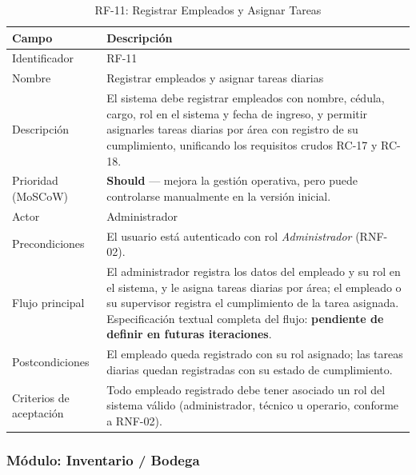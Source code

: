 \documentclass[12pt,a4paper]{article}
\begin{document}
\begin{table}[H]
\centering
\caption{RF-11: Registrar Empleados y Asignar Tareas}
\begin{tabular}{|p{3.6cm}|p{10.4cm}|}
\hline
\textbf{Campo} & \textbf{Descripción} \\
\hline
Identificador & RF-11 \\ \hline
Nombre & Registrar empleados y asignar tareas diarias \\ \hline
Descripción & El sistema debe registrar empleados con nombre, cédula, cargo,
rol en el sistema y fecha de ingreso, y permitir asignarles tareas diarias por
área con registro de su cumplimiento, unificando los requisitos crudos RC-17 y
RC-18. \\ \hline
Prioridad (MoSCoW) & \textbf{Should} --- mejora la gestión operativa, pero
puede controlarse manualmente en la versión inicial. \\ \hline
Actor & Administrador \\ \hline
Precondiciones & El usuario está autenticado con rol \textit{Administrador}
(RNF-02). \\ \hline
Flujo principal & El administrador registra los datos del empleado y su rol en
el sistema, y le asigna tareas diarias por área; el empleado o su supervisor
registra el cumplimiento de la tarea asignada. Especificación textual completa
del flujo: \textbf{pendiente de definir en futuras iteraciones}. \\ \hline
Postcondiciones & El empleado queda registrado con su rol asignado; las
tareas diarias quedan registradas con su estado de cumplimiento. \\ \hline
Criterios de aceptación & Todo empleado registrado debe tener asociado un rol
del sistema válido (administrador, técnico u operario, conforme a RNF-02). \\ \hline
\end{tabular}
\end{table}

\subsubsection{Módulo: Inventario / Bodega}
\end{document}

